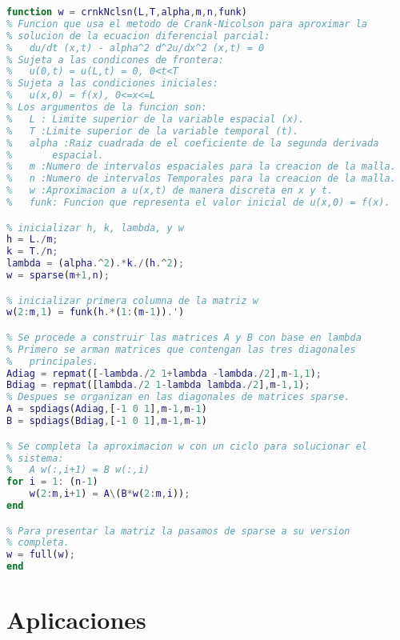 \documentclass[11pt]{article} %
\begin{document}
\begin{lstlisting}[language=Matlab]
function w = crnkNclsn(L,T,alpha,m,n,funk)
% Funcion que usa el metodo de Crank-Nicolson para aproximar la 
% solucion de la ecuacion diferencial parcial:
%	du/dt (x,t) - alpha^2 d^2u/dx^2 (x,t) = 0
% Sujeta a las condicones de frontera:
%	u(0,t) = u(L,t) = 0, 0<t<T
% Sujeta a las condiciones iniciales:
%	u(x,0) = f(x), 0<=x<=L
% Los argumentos de la funcion son:
%	L : Limite superior de la variable espacial (x).
%	T :Limite superior de la variable temporal (t).
%	alpha :Raiz cuadrada de el coeficiente de la segunda derivada 
% 		espacial.
%	m :Numero de intervalos espaciales para la creacion de la malla.
%	n :Numero de intervalos Temporales para la creacion de la malla.
%	w :Aproximacion a u(x,t) de manera discreta en x y t.
%	funk: Funcion que representa el valor inicial de u(x,0) = f(x).

% inicializar h, k, lambda, y w
h = L./m;
k = T./n;
lambda = (alpha.^2).*k./(h.^2);
w = sparse(m+1,n);

% inicializar primera columna de la matriz w
w(2:m,1) = funk(h.*(1:(m-1)).')

% Se procede a construir las matrices A y B con base en lambda
% Primero se arman matrices que contengan las tres diagonales 
%	principales.
Adiag = repmat([-lambda./2 1+lambda -lambda./2],m-1,1);
Bdiag = repmat([lambda./2 1-lambda lambda./2],m-1,1);
% Despues se organizan en las diagonales de matrices sparse.
A = spdiags(Adiag,[-1 0 1],m-1,m-1)
B = spdiags(Bdiag,[-1 0 1],m-1,m-1)

% Se completa la aproximacion w con un ciclo para solucionar el
% sistema:
%	A w(:,i+1) = B w(:,i)
for i = 1: (n-1)
	w(2:m,i+1) = A\(B*w(2:m,i));
end

% Para presentar la matriz la pasamos de sparse a su version
% completa.
w = full(w);
end
\end{lstlisting}

\section*{Aplicaciones}






\end{document}
